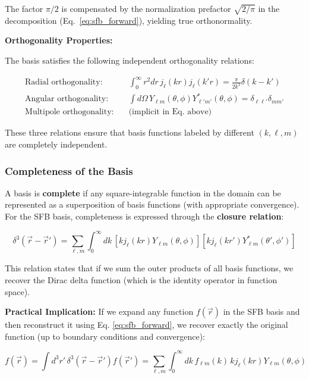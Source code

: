 The factor $\pi/2$ is compensated by the normalization prefactor $\sqrt{2/\pi}$ in the decomposition (Eq.~\eqref{eq:sfb_forward}), yielding true orthonormality.

\textbf{Orthogonality Properties:}

The basis satisfies the following independent orthogonality relations:

\begin{align}
\text{Radial orthogonality:} \quad &\int_0^\infty r^2 dr \, j_\ell(kr) j_\ell(k'r) = \frac{\pi}{2k^2} \delta(k - k') \label{eq:radial_orth}\\
\text{Angular orthogonality:} \quad &\int d\Omega \, Y_{\ell m}(\theta, \phi) Y_{\ell' m'}^*(\theta, \phi) = \delta_{\ell \ell'} \delta_{m m'} \label{eq:angular_orth}\\
\text{Multipole orthogonality:} \quad &\text{(implicit in Eq. above)}
\end{align}

These three relations ensure that basis functions labeled by different $(k, \ell, m)$ are completely independent.

\subsubsection{Completeness of the Basis}

A basis is \textbf{complete} if any square-integrable function in the domain can be represented as a superposition of basis functions (with appropriate convergence). For the SFB basis, completeness is expressed through the \textbf{closure relation}:

\begin{equation}
\delta^3(\vec{r} - \vec{r}') = \sum_{\ell, m} \int_0^\infty dk \, \left[k j_\ell(kr) Y_{\ell m}(\theta, \phi)\right] \left[k j_\ell(k r') Y_{\ell m}^*(\theta', \phi')\right]
\label{eq:closure}
\end{equation}

This relation states that if we sum the outer products of all basis functions, we recover the Dirac delta function (which is the identity operator in function space).

\textbf{Practical Implication:} If we expand any function $f(\vec{r})$ in the SFB basis and then reconstruct it using Eq. \eqref{eq:sfb_forward}, we recover exactly the original function (up to boundary conditions and convergence):

\begin{equation}
f(\vec{r}) = \int d^3 r' \, \delta^3(\vec{r} - \vec{r}') f(\vec{r}') = \sum_{\ell, m} \int_0^\infty dk \, f_{\ell m}(k) \, k j_\ell(kr) Y_{\ell m}(\theta, \phi)
\end{equation}

